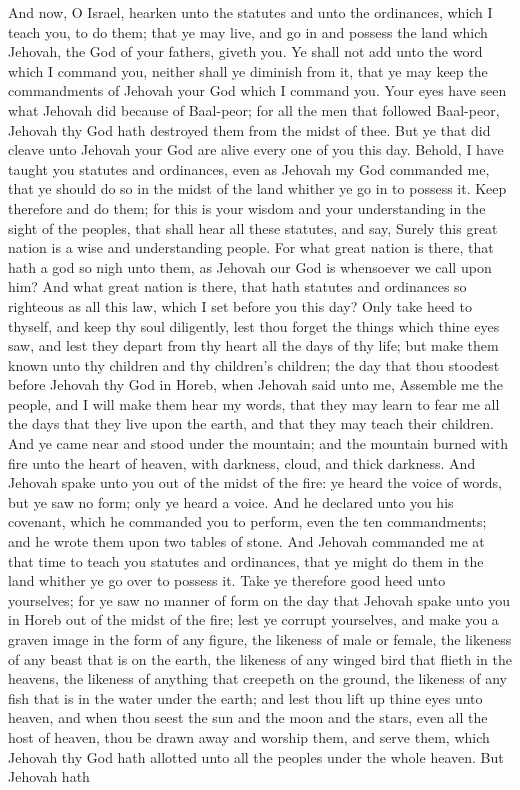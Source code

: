 And now, O Israel, hearken unto the statutes and unto the ordinances, which I teach you, to do them; that ye may live, and go in and possess the land which Jehovah, the God of your fathers, giveth you. Ye shall not add unto the word which I command you, neither shall ye diminish from it, that ye may keep the commandments of Jehovah your God which I command you. Your eyes have seen what Jehovah did because of Baal-peor; for all the men that followed Baal-peor, Jehovah thy God hath destroyed them from the midst of thee. But ye that did cleave unto Jehovah your God are alive every one of you this day. Behold, I have taught you statutes and ordinances, even as Jehovah my God commanded me, that ye should do so in the midst of the land whither ye go in to possess it. Keep therefore and do them; for this is your wisdom and your understanding in the sight of the peoples, that shall hear all these statutes, and say, Surely this great nation is a wise and understanding people. For what great nation is there, that hath a god so nigh unto them, as Jehovah our God is whensoever we call upon him? And what great nation is there, that hath statutes and ordinances so righteous as all this law, which I set before you this day?  Only take heed to thyself, and keep thy soul diligently, lest thou forget the things which thine eyes saw, and lest they depart from thy heart all the days of thy life; but make them known unto thy children and thy children’s children; the day that thou stoodest before Jehovah thy God in Horeb, when Jehovah said unto me, Assemble me the people, and I will make them hear my words, that they may learn to fear me all the days that they live upon the earth, and that they may teach their children. And ye came near and stood under the mountain; and the mountain burned with fire unto the heart of heaven, with darkness, cloud, and thick darkness. And Jehovah spake unto you out of the midst of the fire: ye heard the voice of words, but ye saw no form; only ye heard a voice. And he declared unto you his covenant, which he commanded you to perform, even the ten commandments; and he wrote them upon two tables of stone. And Jehovah commanded me at that time to teach you statutes and ordinances, that ye might do them in the land whither ye go over to possess it.  Take ye therefore good heed unto yourselves; for ye saw no manner of form on the day that Jehovah spake unto you in Horeb out of the midst of the fire; lest ye corrupt yourselves, and make you a graven image in the form of any figure, the likeness of male or female, the likeness of any beast that is on the earth, the likeness of any winged bird that flieth in the heavens, the likeness of anything that creepeth on the ground, the likeness of any fish that is in the water under the earth; and lest thou lift up thine eyes unto heaven, and when thou seest the sun and the moon and the stars, even all the host of heaven, thou be drawn away and worship them, and serve them, which Jehovah thy God hath allotted unto all the peoples under the whole heaven. But Jehovah hath 